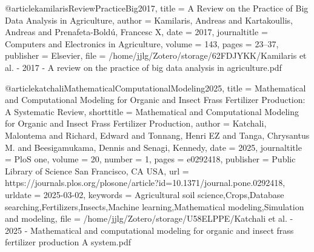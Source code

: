 {{{{@article{kamilarisReviewPracticeBig2017,
  title = {A Review on the Practice of Big Data Analysis in Agriculture},
  author = {Kamilaris, Andreas and Kartakoullis, Andreas and Prenafeta-Boldú, Francesc X},
  date = {2017},
  journaltitle = {Computers and Electronics in Agriculture},
  volume = {143},
  pages = {23--37},
  publisher = {Elsevier},
  file = {/home/jjlg/Zotero/storage/62FDJYKK/Kamilaris et al. - 2017 - A review on the practice of big data analysis in agriculture.pdf}
}

@article{katchaliMathematicalComputationalModeling2025,
  title = {Mathematical and Computational Modeling for Organic and Insect Frass Fertilizer Production: {{A}} Systematic Review},
  shorttitle = {Mathematical and Computational Modeling for Organic and Insect Frass Fertilizer Production},
  author = {Katchali, Malontema and Richard, Edward and Tonnang, Henri EZ and Tanga, Chrysantus M. and Beesigamukama, Dennis and Senagi, Kennedy},
  date = {2025},
  journaltitle = {PloS one},
  volume = {20},
  number = {1},
  pages = {e0292418},
  publisher = {Public Library of Science San Francisco, CA USA},
  url = {https://journals.plos.org/plosone/article?id=10.1371/journal.pone.0292418},
  urldate = {2025-03-02},
  keywords = {Agricultural soil science,Crops,Database searching,Fertilizers,Insects,Machine learning,Mathematical modeling,Simulation and modeling},
  file = {/home/jjlg/Zotero/storage/U58ELPPE/Katchali et al. - 2025 - Mathematical and computational modeling for organic and insect frass fertilizer production A system.pdf}
}

}}}}
